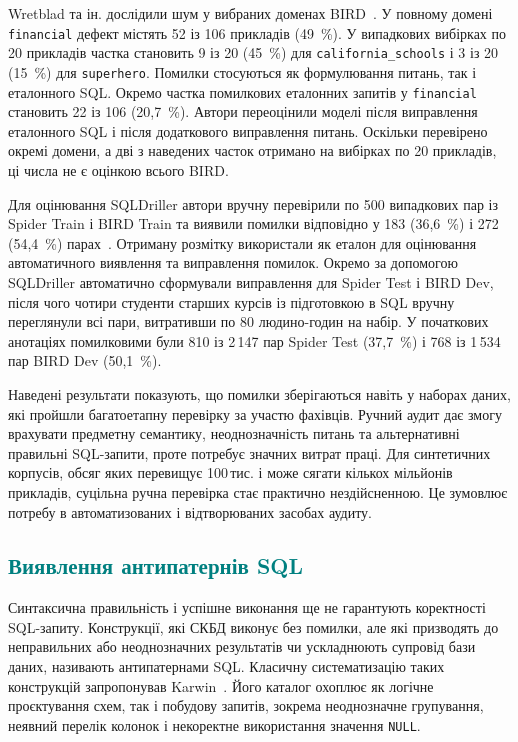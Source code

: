 \documentclass[a4paper,14pt,oneside]{extreport}
\begin{document}
Wretblad та ін. дослідили шум у вибраних доменах BIRD~\cite{wretblad2024noise}. У повному домені \texttt{financial} дефект містять 52 із 106 прикладів (49~\%). У випадкових вибірках по 20 прикладів частка становить 9 із 20 (45~\%) для \texttt{california\_schools} і 3 із 20 (15~\%) для \texttt{superhero}. Помилки стосуються як формулювання питань, так і еталонного SQL. Окремо частка помилкових еталонних запитів у \texttt{financial} становить 22 із 106 (20,7~\%). Автори переоцінили моделі після виправлення еталонного SQL і після додаткового виправлення питань. Оскільки перевірено окремі домени, а дві з наведених часток отримано на вибірках по 20 прикладів, ці числа не є оцінкою всього BIRD.

Для оцінювання SQLDriller автори вручну перевірили по 500 випадкових пар із Spider Train і BIRD Train та виявили помилки відповідно у 183 (36,6~\%) і 272 (54,4~\%) парах~\cite{yang2025sqldriller}. Отриману розмітку використали як еталон для оцінювання автоматичного виявлення та виправлення помилок. Окремо за допомогою SQLDriller автоматично сформували виправлення для Spider Test і BIRD Dev, після чого чотири студенти старших курсів із підготовкою в SQL вручну переглянули всі пари, витративши по 80 людино-годин на набір. У початкових анотаціях помилковими були 810 із 2\,147 пар Spider Test (37,7~\%) і 768 із 1\,534 пар BIRD Dev (50,1~\%).

Наведені результати показують, що помилки зберігаються навіть у наборах даних, які пройшли багатоетапну перевірку за участю фахівців. Ручний аудит дає змогу врахувати предметну семантику, неоднозначність питань та альтернативні правильні SQL-запити, проте потребує значних витрат праці. Для синтетичних корпусів, обсяг яких перевищує 100\,тис. і може сягати кількох мільйонів прикладів, суцільна ручна перевірка стає практично нездійсненною. Це зумовлює потребу в автоматизованих і відтворюваних засобах аудиту.

\subsection{\textcolor{teal}{Виявлення антипатернів SQL}}
\label{subsec:antipatterns}

Синтаксична правильність і успішне виконання ще не гарантують коректності SQL-запиту. Конструкції, які СКБД виконує без помилки, але які призводять до неправильних або неоднозначних результатів чи ускладнюють супровід бази даних, називають антипатернами SQL. Класичну систематизацію таких конструкцій запропонував Karwin~\cite{karwin2010sqlantipatterns}. Його каталог охоплює як логічне проєктування схем, так і побудову запитів, зокрема неоднозначне групування, неявний перелік колонок і некоректне використання значення \texttt{NULL}.
\end{document}
